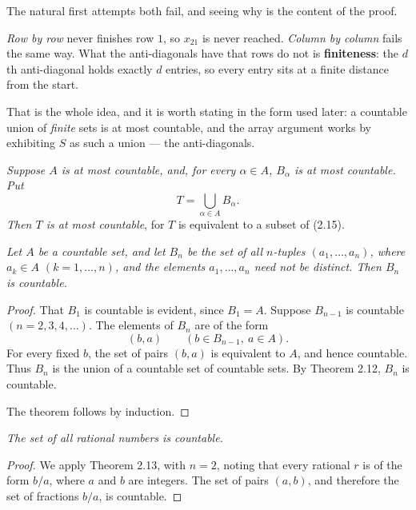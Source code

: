 \begin{unpack}
The natural first attempts both fail, and seeing why is the content of the
proof.

\smallskip
\emph{Row by row} never finishes row $1$, so $x_{21}$ is never reached.
\emph{Column by column} fails the same way. What the anti-diagonals have that
rows do not is \textbf{finiteness}: the $d$th anti-diagonal holds exactly $d$
entries, so every entry sits at a finite distance from the start.

\smallskip
That is the whole idea, and it is worth stating in the form used later: a
countable union of \emph{finite} sets is at most countable, and the array
argument works by exhibiting $S$ as such a union --- the anti-diagonals.
\end{unpack}

\emph{Suppose $A$ is at most countable, and, for every $\alpha \in A$,
$B_\alpha$ is at most countable. Put}
\[ T = \bigcup_{\alpha \in A} B_\alpha. \]
\emph{Then $T$ is at most countable}, for $T$ is equivalent to a subset of
(2.15).

\emph{Let $A$ be a countable set, and let $B_n$ be the set of all $n$-tuples
$(a_1,\dots,a_n)$, where $a_k \in A$ $(k = 1,\dots,n)$, and the elements
$a_1,\dots,a_n$ need not be distinct. Then $B_n$ is countable.}

\begin{proof}
That $B_1$ is countable is evident, since $B_1 = A$. Suppose $B_{n-1}$ is
countable $(n = 2,3,4,\dots)$. The elements of $B_n$ are of the form
\begin{equation}
  (b,a) \qquad (b \in B_{n-1},\ a \in A). \tag{2.18}
\end{equation}
For every fixed $b$, the set of pairs $(b,a)$ is equivalent to $A$, and hence
countable. Thus $B_n$ is the union of a countable set of countable sets. By
Theorem 2.12, $B_n$ is countable.

The theorem follows by induction.
\end{proof}

\emph{The set of all rational numbers is countable.}

\begin{proof}
We apply Theorem 2.13, with $n = 2$, noting that every rational $r$ is of the
form $b/a$, where $a$ and $b$ are integers. The set of pairs $(a,b)$, and
therefore the set of fractions $b/a$, is countable.
\end{proof}

